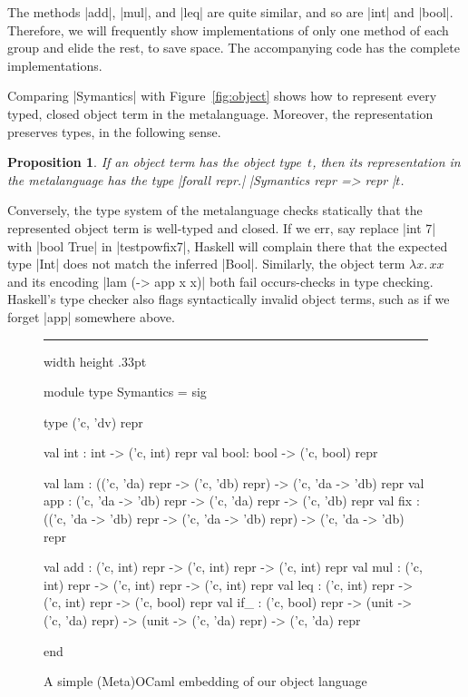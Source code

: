 \documentclass[preprint]{sigplanconf}
\newtheorem{prop}{Proposition}
\newcommand{\fun}[1]{\mathopen{\lambda\mathord{#1}.\,}}
\newenvironment{floatrule}
    {\hrule width \hsize height .33pt \vspace{.5pc}}
    {\par\addvspace{1ex}}
\begin{document}
The methods |add|, |mul|, and |leq| are quite similar, and so are
|int| and |bool|. Therefore, we will frequently show implementations of
only one method of each group and elide the rest, to save space. The
accompanying code has the complete implementations.

Comparing |Symantics| with Figure~\ref{fig:object}
shows how to represent every typed, closed object term in the
metalanguage. Moreover, the representation preserves types, in the following
sense.
\begin{prop}
If an object term has the object type~$t$, then its
representation in the metalanguage has the type 
|forall repr.| |Symantics repr => repr |$t$.
\end{prop}
Conversely, the type system of the metalanguage checks statically that the
represented object term is well-typed and closed.
If we err, say replace |int 7| with |bool True| in
|testpowfix7|, Haskell will complain there that the expected type |Int| does not
match the inferred |Bool|.  Similarly, the object term $\fun{x}xx$ and its
encoding |lam (\x -> app x x)| both fail occurs-checks in type checking.
Haskell's type checker also flags syntactically invalid object terms, such as if
we forget |app| somewhere above.

\begin{figure*}
\begin{floatrule}
\begin{code}
module type Symantics = sig

  type ('c, 'dv) repr

  val int : int  -> ('c, int) repr
  val bool: bool -> ('c, bool) repr

  val lam : (('c, 'da) repr -> ('c, 'db) repr) -> ('c, 'da -> 'db) repr
  val app : ('c, 'da -> 'db) repr -> ('c, 'da) repr -> ('c, 'db) repr
  val fix : (('c, 'da -> 'db) repr -> ('c, 'da -> 'db) repr) -> ('c, 'da -> 'db) repr

  val add : ('c, int) repr -> ('c, int) repr -> ('c, int) repr
  val mul : ('c, int) repr -> ('c, int) repr -> ('c, int) repr
  val leq : ('c, int) repr -> ('c, int) repr -> ('c, bool) repr
  val if_ : ('c, bool) repr -> (unit -> ('c, 'da) repr) -> (unit -> ('c, 'da) repr) -> ('c, 'da) repr

end
\end{code}
\end{floatrule}
\caption{A simple (Meta)OCaml embedding of our object language}
\label{fig:ocaml-simple}
\end{figure*}
\end{document}
